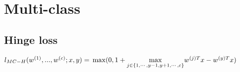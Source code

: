 \section*{Multi-class}
\subsection*{Hinge loss}
$l_{MC-H}(w^{(1)},...,w^{(c)};x,y) =\\
\max (0,1+\underset{j\in\{1,\cdots,y-1,y+1,\cdots,c\}}{\max} w^{(j)T} x - w^{(y)T} x)$